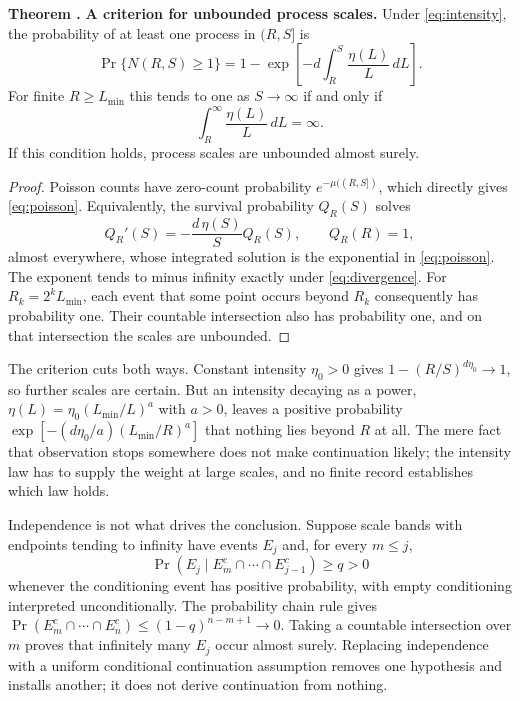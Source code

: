 \documentclass[10pt]{article}
\newcounter{claim}
\newcommand{\claim}[2]{\refstepcounter{claim}\label{#1}\textbf{#2 \theclaim.}}
\begin{document}
\begin{resultbox}
\claim{thm:scales}{Theorem} \textbf{A criterion for unbounded process scales.}
Under \eqref{eq:intensity}, the probability of at least one process in $(R,S]$ is
\begin{equation}
\Pr\{N(R,S)\geq1\}
=1-\exp\!\left[-d\int_R^S\frac{\eta(L)}{L}\,dL\right].
\label{eq:poisson}
\end{equation}
For finite $R\geq L_{\min}$ this tends to one as $S\to\infty$ if and only if
\begin{equation}
\int_R^\infty\frac{\eta(L)}{L}\,dL=\infty.
\label{eq:divergence}
\end{equation}
If this condition holds, process scales are unbounded almost surely.
\end{resultbox}
\begin{proof}
Poisson counts have zero-count probability $e^{-\mu((R,S])}$, which directly
gives \eqref{eq:poisson}. Equivalently, the survival probability $Q_R(S)$ solves
\[
Q_R'(S)=-\frac{d\,\eta(S)}{S}Q_R(S),\qquad Q_R(R)=1,
\]
almost everywhere, whose integrated solution is the exponential in
\eqref{eq:poisson}. The exponent tends to minus infinity exactly under
\eqref{eq:divergence}. For $R_k=2^kL_{\min}$, each event that some point occurs
beyond $R_k$ consequently has probability one. Their countable intersection
also has probability one, and on that intersection the scales are unbounded.
\end{proof}

The criterion cuts both ways. Constant intensity $\eta_0>0$ gives
$1-(R/S)^{d\eta_0}\to1$, so further scales are certain. But an intensity
decaying as a power, $\eta(L)=\eta_0(L_{\min}/L)^a$ with $a>0$, leaves a
positive probability $\exp[-(d\eta_0/a)(L_{\min}/R)^a]$ that nothing lies beyond
$R$ at all. The mere fact that observation stops somewhere does not make
continuation likely; the intensity law has to supply the weight at large scales,
and no finite record establishes which law holds.

Independence is not what drives the conclusion. Suppose scale bands with
endpoints tending to infinity have events $E_j$ and, for every $m\leq j$,
\[
\Pr(E_j\mid E_m^c\cap\cdots\cap E_{j-1}^c)\geq q>0
\]
whenever the conditioning event has positive probability, with empty
conditioning interpreted unconditionally. The probability chain rule gives
$\Pr(E_m^c\cap\cdots\cap E_n^c)\leq(1-q)^{n-m+1}\to0$.
Taking a countable intersection over $m$ proves that infinitely many $E_j$
occur almost surely. Replacing independence with a uniform conditional
continuation assumption removes one hypothesis and installs another; it does not
derive continuation from nothing.
\end{document}
